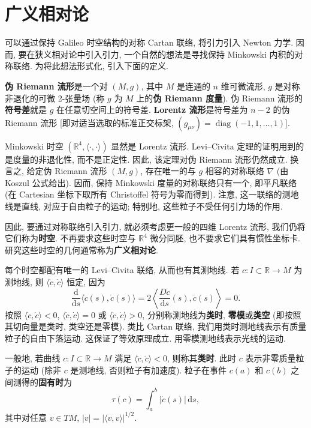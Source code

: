 \section{广义相对论}\label{sec:general-relativity}

可以通过保持 Galileo 时空结构的对称 Cartan 联络, 将引力引入 Newton 力学. 因而, 要在狭义相对论中引入引力, 一个自然的想法是寻找保持 Minkowski 内积的对称联络. 为将此想法形式化, 引入下面的定义.

\begin{RiemannDefinition}\label{def:pseudo-riemannian-and-lorentzian-manifolds}
\textbf{伪 Riemann 流形}是一个对 $(M,g)$, 其中 $M$ 是连通的 $n$ 维可微流形, $g$ 是对称非退化的可微 2-张量场 (称 $g$ 为 $M$ 上的\textbf{伪 Riemann 度量}). 伪 Riemann 流形的\textbf{符号差}就是 $g$ 在任意切空间上的符号差. \textbf{Lorentz 流形}是符号差为 $n-2$ 的伪 Riemann 流形 [即对适当选取的标准正交标架, $(g_{\mu\nu})=\operatorname{diag}(-1,1,\ldots,1)$].
\end{RiemannDefinition}

Minkowski 时空 $(\mathbb{R}^4,\langle\cdot,\cdot\rangle)$ 显然是 Lorentz 流形. Levi–Civita 定理的证明用到的是度量的非退化性, 而不是正定性. 因此, 该定理对伪 Riemann 流形仍然成立. 换言之, 给定伪 Riemann 流形 $(M,g)$, 存在唯一的与 $g$ 相容的对称联络 $\nabla$ (由 Koszul 公式给出). 因而, 保持 Minkowski 度量的对称联络只有一个, 即平凡联络 (在 Cartesian 坐标下取所有 Christoffel 符号为零而得到). 注意, 这一联络的测地线是直线, 对应于自由粒子的运动; 特别地, 这些粒子不受任何引力场的作用.

因此, 要通过对称联络引入引力, 就必须考虑更一般的四维 Lorentz 流形, 我们仍将它们称为\textbf{时空}. 不再要求这些时空与 $\mathbb{R}^4$ 微分同胚, 也不要求它们具有惯性坐标卡. 研究这些时空的几何通常称为\textbf{广义相对论}.

每个时空都配有唯一的 Levi–Civita 联络, 从而也有其测地线. 若 $c:I\subset\mathbb{R}\to M$ 为测地线, 则 $\langle\dot c,\dot c\rangle$ 恒定, 因为
\[
  \frac{\mathrm{d}}{\mathrm{d}s}\langle\dot c(s),\dot c(s)\rangle
  =2\left\langle\frac{D\dot c}{\mathrm{d}s}(s),\dot c(s)\right\rangle=0.
\]
按照 $\langle\dot c,\dot c\rangle<0$, $\langle\dot c,\dot c\rangle=0$ 或 $\langle\dot c,\dot c\rangle>0$, 分别称测地线为\textbf{类时}, \textbf{零模}或\textbf{类空} (即按照其切向量是类时, 类空还是零模). 类比 Cartan 联络, 我们用类时测地线表示有质量粒子的自由下落运动. 这保证了等效原理成立. 用零模测地线表示光线的运动.

一般地, 若曲线 $c:I\subset\mathbb{R}\to M$ 满足 $\langle\dot c,\dot c\rangle<0$, 则称其\textbf{类时}. 此时 $c$ 表示非零质量粒子的运动 (除非 $c$ 是测地线, 否则粒子有加速度). 粒子在事件 $c(a)$ 和 $c(b)$ 之间测得的\textbf{固有时}为
\[
  \tau(c)=\int_a^b|\dot c(s)|\,\mathrm{d}s,
\]
其中对任意 $v\in TM$, $|v|=|\langle v,v\rangle|^{1/2}$.

